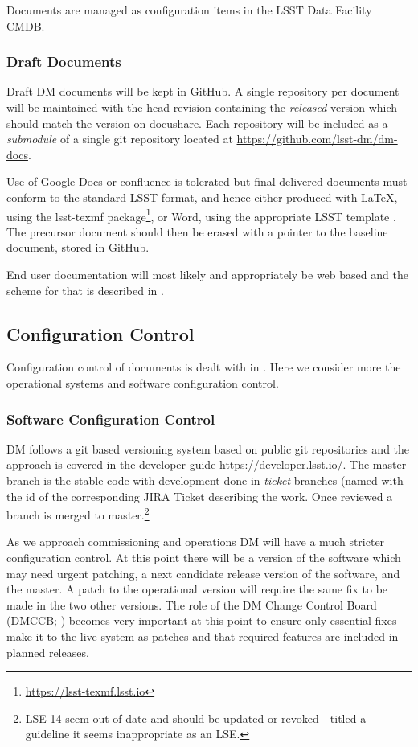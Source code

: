 Documents are managed as configuration items in the LSST Data Facility CMDB.

\subsubsection{Draft Documents}

Draft DM documents will be kept in GitHub. A single repository per document will be maintained with the head revision containing the \emph{released } version which should match the version on docushare. Each repository will be included as a \emph{submodule} of a single git repository located at \url{https://github.com/lsst-dm/dm-docs}.

Use of Google Docs or confluence is tolerated but final delivered documents must conform to the standard LSST format, and hence either produced with LaTeX, using the lsst-texmf package\footnote{\url{https://lsst-texmf.lsst.io}}, or Word, using the appropriate LSST template . The precursor document should then be erased with a pointer to the baseline document, stored in GitHub.

End user documentation will most likely and appropriately be web based and the scheme for that is described in .

\subsection {Configuration Control} \label{sect:config}

Configuration control of documents is dealt with in . Here we consider more the operational systems and software configuration control.

\subsubsection{Software Configuration Control}

DM follows a git based versioning system based  on public git repositories and the approach is covered in the developer guide \url{https://developer.lsst.io/}.
The master branch is the stable code with development done in \emph{ticket} branches (named with the id of the corresponding JIRA Ticket describing the work.
Once reviewed a branch is merged to master.\footnote{LSE-14 seem out of date and should be updated or revoked - titled a guideline it seems inappropriate as an LSE.}

As we approach commissioning and operations DM will have a much stricter configuration control.
At this point there will be a version of the software which may need urgent patching, a next candidate release version of the software, and the master.
A patch to the operational version will require the same fix to be made in the two other versions.
The role of the DM Change Control Board (DMCCB; ) becomes very important at this point to ensure only essential fixes make it to the live system as patches and that required features are included in planned releases.

